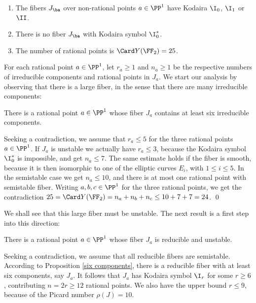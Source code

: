 \begin{enumerate}

\item
\label{non-rational}
The fibers $J_\ba$ over non-rational points $a\in\PP^1$ have Kodaira $\I_0$, $\I_1$ or $\II$.
\item
\label{I0*}
There is no fiber $J_\ba$ with Kodaira symbol $\I_0^*$.
\item
\label{points}
The number of rational points is $\Card Y(\FF_2)=25$.
\end{enumerate}

For each rational point $a\in \PP^1$, let
$r_a\geq 1$ and $n_a\geq 1$  be the respective numbers of irreducible components and rational points in $J_a$.
We start our analysis by observing that there is a large fiber, in the sense that there are many irreducible
components:

\begin{proposition}
\notready
\label{six   components}
There is a rational point $a\in\PP^1$ whose fiber $J_a$ contains at least six irreducible components.
\end{proposition}

\proof
Seeking a contradiction, we   assume that $r_a\leq 5$ for the three rational points $a\in\PP^1$.
If $J_a$ is unstable we actually have $r_a\leq 3$, because the Kodaira symbol $\I_0^*$ is impossible,
and  get $n_a\leq 7$.
The same estimate holds if the fiber is smooth, because it is then isomorphic to one of the elliptic curves
$E_i$, with $1\leq i\leq 5$.
In the semistable case we get $n_a\leq 10$, and there is at most one rational point with
semistable fiber. Writing $a,b,c\in\PP^1$ for the three rational points,
we get the  contradiction $25=\Card Y(\FF_2)=n_a+n_b+n_c\leq 10 + 7 + 7= 24$.
\qed


We shall see that this large fiber must be unstable. The next result is a  first step into this direction:

\begin{proposition}
\notready
\label{unstable fiber}
There is a rational point $a\in\PP^1$ whose fiber $J_a$ is reducible and unstable.
\end{proposition}

\proof
Seeking a contradiction, we assume that all reducible fibers are semistable.
According to Proposition \ref{six components}, there is a reducible fiber with at least six components,
say $J_a$.
It follows that $J_a$ has Kodaira symbol $\I_r$ for some $r\geq 6$,
contributing $n=2r\geq 12$ rational points. We also have the upper bound $r\leq 9$, because
of the Picard number $\rho(J)=10$.

